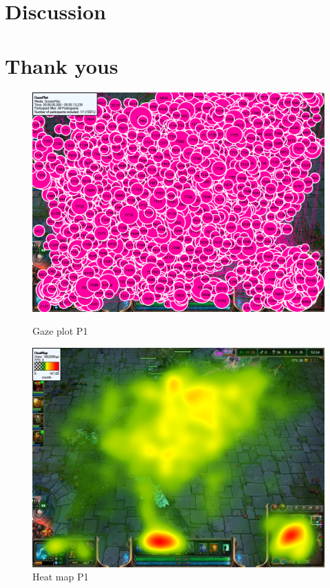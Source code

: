 \documentclass{article}
\begin{document}
\section{Discussion}

\section{Thank yous}

\begin{figure}[ht]
\begin{minipage}[b]{0.45\linewidth}
\centering
\includegraphics[width=\textwidth]{images/gazeplot/Emelie}
\caption{Gaze plot P1}
\label{gaze_eme}
\end{minipage}
\hspace{0.5cm}
\begin{minipage}[b]{0.45\linewidth}
\centering
\includegraphics[width=\textwidth]{images/heatmap/Emelie}
\caption{Heat map P1}
\label{heat_eme}
\end{minipage}
\end{figure}
\end{document}
